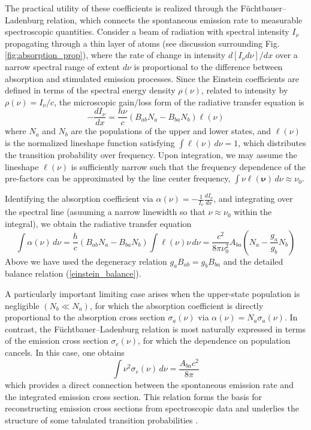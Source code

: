 \documentclass[12pt]{report}
\begin{document}
	The practical utility of these coefficients is realized through the Füchtbauer–Ladenburg relation, which connects the spontaneous emission rate to measurable spectroscopic quantities. Consider a beam of radiation with spectral intensity $I_\nu$ propagating through a thin layer of atoms (see discussion surrounding Fig. \ref{fig:absorption_prop}), where the rate of change in intensity $d\left[I_{\nu}d\nu\right] / dx$ over a narrow spectral range of extent $d\nu$ is proportional to the difference between absorption and stimulated emission processes. Since the Einstein coefficients are defined in terms of the spectral energy density $\rho(\nu)$, related to intensity by $\rho(\nu) = I_\nu / c$, the microscopic gain/loss form of the radiative transfer equation is
	\begin{equation}
		-\frac{d I_\nu}{dx} = \frac{h\nu}{c} \left( B_{ab} N_a - B_{ba} N_b \right) \ell(\nu)
	\end{equation}	
	where $N_a$ and $N_b$ are the populations of the upper and lower states, and $\ell(\nu)$ is the normalized lineshape function satisfying $\int \ell(\nu) \, d\nu = 1$, which distributes the transition probability over frequency. Upon integration, we may assume the lineshape $\ell(\nu)$ is sufficiently narrow such that the frequency dependence of the pre-factors can be approximated by the line center frequency, $\int \nu \ell(\mathbf{\nu}) \, d\nu \approx \nu_0$.
	
	Identifying the absorption coefficient via $\alpha(\nu) = -\frac{1}{I_\nu}\frac{dI_\nu}{dx}$, and integrating over the spectral line (asuuming a narrow linewidth so that $\nu \approx \nu_0$ within the integral), we obtain the radiative transfer equation
	\begin{equation}
		\int \alpha(\nu)\,d\nu
		= \frac{h}{c} \left( B_{ab} N_a - B_{ba} N_b \right) \int \ell(\nu) \nu \, d\nu
		= \frac{c^2}{8\pi \nu_0^2} A_{ba} \left( N_a - \frac{g_a}{g_b} N_b \right)
	\end{equation}
	Above we have used the degeneracy relation $g_a B_{ab} = g_b B_{ba}$ and the detailed balance relation (\ref{einstein_balance}).
	
	A particularly important limiting case arises when the upper-state population is negligible $(N_b \ll N_a)$, for which the absorption coefficient is directly proportional to the absorption cross section $\sigma_a(\nu)$ via $\alpha(\nu) = N_a \sigma_a(\nu)$. In contrast, the Füchtbauer–Ladenburg relation is most naturally expressed in terms of the emission cross section $\sigma_e(\nu)$, for which the dependence on population cancels. In this case, one obtains
	\begin{equation}
		\int \nu^2 \sigma_e(\nu)\, d\nu = \frac{A_{ba} c^2}{8\pi}
	\end{equation}
	which provides a direct connection between the spontaneous emission rate and the integrated emission cross section. This relation forms the basis for reconstructing emission cross sections from spectroscopic data and underlies the structure of some tabulated transition probabilities \cite{lineshapes_fuchtbauer_laden}.
	
\end{document}
